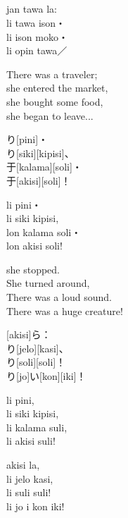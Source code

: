 \documentclass{ctexart}
\begin{document}
{
\noindent
\begin{minipage}[t]{3.25cm}
{\textCJKfancy{}\LARGE
  \\
  \\
  \\
  \\
}

{\large
  jan tawa la:\\
  li tawa ison・\\
  li ison moko・\\
  li opin tawa／\\
}

{\scriptsize
  There was a traveler;\\
  she entered the market,\\
  she bought some food,\\
  she began to leave...\\
}
\end{minipage}
\begin{minipage}[t]{3.25cm}
{\textCJKfancy{}\LARGE
  り[pini]・\\
  り[siki][kipisi]、\\
  于[kalama][soli]・\\
  于[akisi][soli]！\\
}

{\large
  li pini・\\
  li siki kipisi,\\
  lon kalama soli・\\
  lon akisi soli!\\
}

{\scriptsize
  she stopped.\\
  She turned around,\\
  There was a loud sound.\\
  There was a huge creature!\\
}
\end{minipage}
\begin{minipage}[t]{3.75cm}
[akisi]ら：\\
り[jelo][kasi]、\\
り[soli][soli]！\\
り[jo]い[kon][iki]！\\
\end{minipage}}

{
\large
\noindent
\begin{minipage}[t]{3.5cm}
li pini,\\
li siki kipisi,\\
li kalama suli,\\
li akisi suli!\\
\end{minipage}
\begin{minipage}[t]{3.75cm}
akisi la,\\
li jelo kasi,\\
li suli suli!\\
li jo i kon iki!\\
\end{minipage}
}
\end{document}

